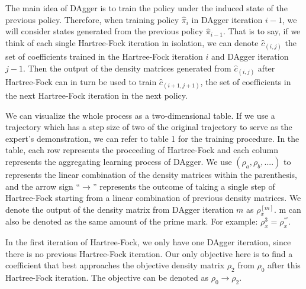 \documentclass[twoside]{article}
\begin{document}





The main idea of DAgger is to train the policy under the induced state of the previous policy. Therefore, when training policy $\hat{\pi}_{i}$ in DAgger iteration $i-1$,
we will consider states generated from the previous policy $\hat{\pi}_{i-1}$. That is to say, if we think of each single Hartree-Fock iteration in isolation, we can denote $\hat{c}_{(i,j)}$ the set of coefficients trained in the Hartree-Fock iteration $i$ and DAgger iteration $j-1$. Then the output of the density matrices generated from $\hat{c}_{(i,j)}$ after Hartree-Fock can in turn be used to train $\hat{c}_{(i+1,j+1)}$, the set of coefficients in the next Hartree-Fock iteration in the next policy.



We can visualize the whole process as a two-dimensional table. If we use a trajectory which has a step size of two of the original trajectory to serve as the expert's demonstration, we can refer to table 1 for the training procedure.
In the table, each row represents the proceeding of Hartree-Fock and each column represents the aggregating learning process of DAgger. We use $(\rho_a, \rho_b, ....)$ to represents the linear combination of the density matrices within the parenthesis, and the arrow sign ``$\rightarrow$'' represents the outcome of taking a single step of Hartree-Fock starting from a linear combination of previous density matrices. We denote the output of the density matrix from DAgger iteration $m$ as $\rho_x^{[m]}$. m can also be denoted as the same amount of the prime mark. For example: $\rho_x^{3} = \rho_x^{'''}$.

In the first iteration of Hartree-Fock, we only have one DAgger iteration, since there is no previous Hartree-Fock iteration. Our only objective here is to find a coefficient that best approaches the objective density matrix $\rho_2$ from  $\rho_0$ after this Hartree-Fock iteration. The objective can be denoted as $\rho_0 \rightarrow \rho_2$. 
\end{document}
